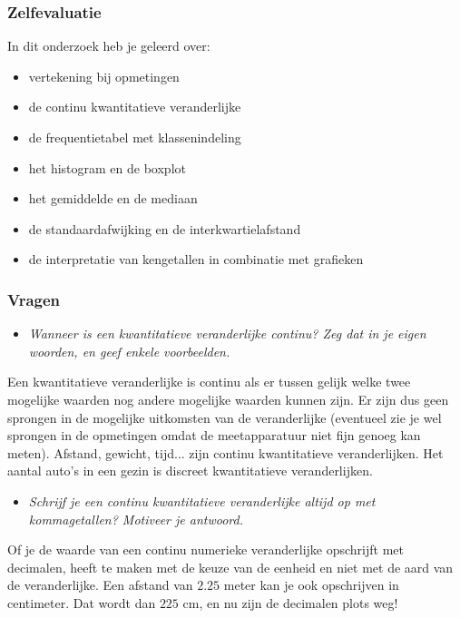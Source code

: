 \documentclass[dutch]{beamer}
\newcommand{\vraag}[1]{\begin{itemize}\item[Vraag:] {\it #1}\end{itemize}}
\begin{document}
\begin{frame}
\frametitle{Zelfevaluatie}
In dit onderzoek heb je geleerd over:
\begin{itemize}
  \item vertekening bij opmetingen
  \item de continu kwantitatieve veranderlijke
  \item de frequentietabel met klassenindeling
  \item het histogram en de boxplot
  \item het gemiddelde en de mediaan
  \item de standaardafwijking en de interkwartielafstand
  \item de interpretatie van kengetallen in combinatie met grafieken
\end{itemize}
\end{frame}

\begin{frame}
\frametitle{Vragen}
\vraag{Wanneer is een kwantitatieve veranderlijke continu? Zeg dat in je eigen woorden, en geef enkele voorbeelden.}
\pause
Een kwantitatieve veranderlijke is continu als er tussen gelijk welke twee mogelijke waarden nog andere mogelijke waarden kunnen zijn. Er zijn dus geen sprongen in de mogelijke uitkomsten van de veranderlijke (eventueel zie je wel sprongen in de opmetingen omdat de meetapparatuur niet fijn genoeg kan meten). Afstand, gewicht, tijd... zijn continu kwantitatieve veranderlijken. Het aantal auto’s in een gezin is discreet kwantitatieve veranderlijken.
\pause
\vraag{Schrijf je een continu kwantitatieve veranderlijke altijd op met kommagetallen? Motiveer je
antwoord.}
\pause
Of je de waarde van een continu numerieke veranderlijke opschrijft met decimalen, heeft te maken met de keuze van de eenheid en niet met de aard van de veranderlijke. Een afstand van $2.25$ meter kan je ook opschrijven in centimeter. Dat wordt dan $225$ cm, en nu zijn de decimalen plots weg!
\end{frame}
\end{document}
